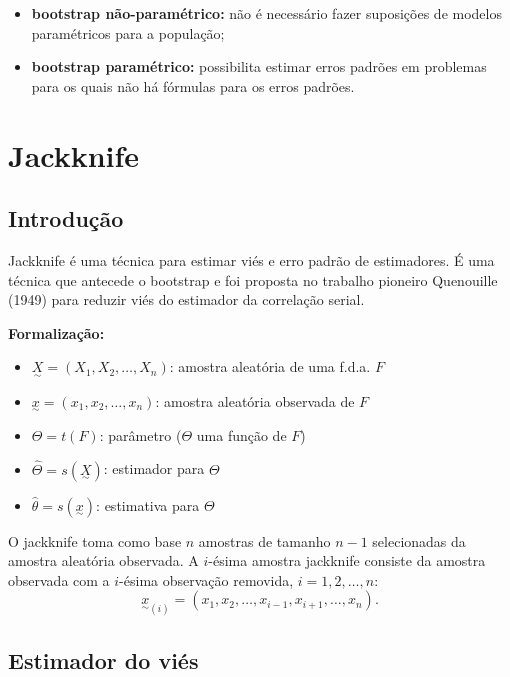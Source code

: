 \documentclass[
  letterpaper,
  DIV=11,
  numbers=noendperiod]{scrreprt}
\providecommand{\tightlist}{%
  \setlength{\itemsep}{0pt}\setlength{\parskip}{0pt}}\usepackage{longtable,booktabs,array}
\begin{document}
\begin{itemize}
\tightlist
\item
  \textbf{bootstrap não-paramétrico:} não é necessário fazer suposições
  de modelos paramétricos para a população;
\item
  \textbf{bootstrap paramétrico:} possibilita estimar erros padrões em
  problemas para os quais não há fórmulas para os erros padrões.
\end{itemize}

\section{Jackknife}\label{jackknife}

\subsection{Introdução}\label{introduuxe7uxe3o-4}

Jackknife é uma técnica para estimar viés e erro padrão de estimadores.
É uma técnica que antecede o bootstrap e foi proposta no trabalho
pioneiro Quenouille (1949) para reduzir viés do estimador da correlação
serial.

\textbf{Formalização:}

\begin{itemize}
\item
  \(\underset{\sim}{X} = (X_1, X_2, \dots, X_n)\): amostra aleatória de
  uma f.d.a. \(F\)
\item
  \(\underset{\sim}{x} = (x_1, x_2, \dots, x_n)\): amostra aleatória
  observada de \(F\)
\item
  \(\Theta=t(F)\): parâmetro (\(\Theta\) uma função de \(F\))
\item
  \(\hat{\Theta}=s(\underset{\sim}{X})\): estimador para \(\Theta\)
\item
  \(\hat{\theta}=s(\underset{\sim}{x})\): estimativa para \(\Theta\)
\end{itemize}

O jackknife toma como base \(n\) amostras de tamanho \(n-1\)
selecionadas da amostra aleatória observada. A \(i\)-ésima amostra
jackknife consiste da amostra observada com a \(i\)-ésima observação
removida, \(i=1,2, \ldots, n\):
\[{\underset{\sim}{x}}_{(i)}=(x_1,x_2,\ldots, x_{i-1},x_{i+1}, \ldots, x_n).\]

\subsection{Estimador do viés}\label{estimador-do-viuxe9s}
\end{document}
